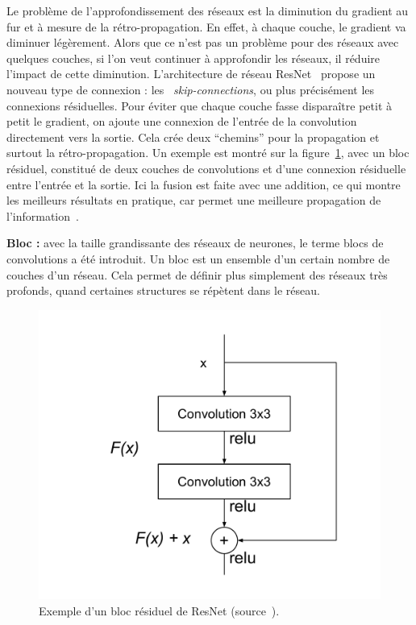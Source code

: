 Le problème de l'approfondissement des réseaux est la diminution du gradient au fur et à mesure de la rétro-propagation.
En effet, à chaque couche, le gradient va diminuer légèrement. 
Alors que ce n'est pas un problème pour des réseaux avec quelques couches, si l'on veut continuer à approfondir les réseaux, il réduire l'impact de cette diminution.
L'architecture de réseau ResNet~\cite{he2015delving} propose un nouveau type de connexion : les ~\textit{skip-connections}, ou plus précisément les connexions résiduelles.
Pour éviter que chaque couche fasse disparaître petit à petit le gradient, on ajoute une connexion de l'entrée de la convolution directement vers la sortie. 
Cela crée deux ``chemins'' pour la propagation et surtout la rétro-propagation.
Un exemple est montré sur la figure~\ref{fig:resnet}, avec un bloc résiduel, constitué de deux couches de convolutions et d'une connexion résiduelle entre l'entrée et la sortie.
Ici la fusion est faite avec une addition, ce qui montre les meilleurs résultats en pratique, car permet une meilleure propagation de l'information~\cite{he2016identity}.

\begin{oframed}

\textbf{Bloc :} avec la taille grandissante des réseaux de neurones, le terme blocs de convolutions a été introduit. Un bloc est un ensemble d'un certain nombre de couches d'un réseau. Cela permet de définir plus simplement des réseaux très profonds, quand certaines structures se répètent dans le réseau. 

\end{oframed}



\begin{figure}%
\centering
\includegraphics[width=.5\columnwidth]{figures/ResNet.pdf}%
\caption{Exemple d'un bloc résiduel de ResNet (source~\cite{he2015delving}).}%
\label{fig:resnet}%
\end{figure}

